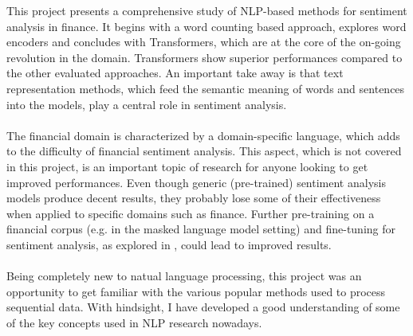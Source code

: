 \documentclass[final]{cvpr}
\begin{document}
This project presents a comprehensive study of NLP-based methods for sentiment analysis in finance. It begins with a word counting based approach, explores word encoders and concludes with Transformers, which are at the core of the on-going revolution in the domain. Transformers show superior performances compared to the other evaluated approaches. An important take away is that text representation methods, which feed the semantic meaning of words and sentences into the models, play a central role in sentiment analysis.\\
\\
The financial domain is characterized by a domain-specific language, which adds to the difficulty of financial sentiment analysis. This aspect, which is not covered in this project, is an important topic of research for anyone looking to get improved performances. Even though generic (pre-trained) sentiment analysis models produce decent results, they probably lose some of their effectiveness when applied to specific domains such as finance. Further pre-training on a financial corpus (e.g. in the masked language model setting) and fine-tuning for sentiment analysis, as explored in \cite{FinBERT}, could lead to improved results.\\
\\
Being completely new to natual language processing, this project was an opportunity to get familiar with the various popular methods used to process sequential data. With hindsight, I have developed a good understanding of some of the key concepts used in NLP research nowadays.

{\small
	
	
}
\end{document}

